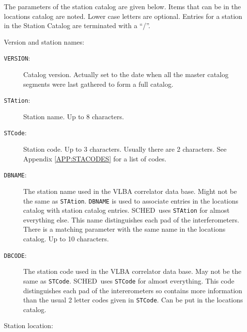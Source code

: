 \documentclass{report}
\newcommand{\schedb}{{\sc SCHED~}}
\begin{document}
The parameters of the station catalog are given below.  Items that can
be in the locations catalog are noted.  Lower case letters are
optional.  Entries for a station in the Station Catalog are terminated with
a ``/''.

Version and station names:

\begin{description}

\item [{\tt VERSION}:] Catalog version.  Actually set to the date when
all the master catalog segments were last gathered to form a full catalog.

\item [{\tt STAtion}:] Station name. Up to 8 characters.

\item [{\tt STCode}:] Station code. Up to 3 characters.  Usually there
are 2 characters.  See Appendix \ref{APP:STACODES} for a list
of codes.

\item [{\tt DBNAME}:] The station name used in the VLBA correlator
data base.  Might not be the same as {\tt STAtion}.  {\tt DBNAME} is
used to associate entries in the locations catalog with station
catalog entries.  \schedb uses {\tt STAtion} for almost everything
else.  This name distinguishes each pad of the interferometers.
There is a matching parameter with the same name in the locations
catalog.  Up to 10 characters.

\item [{\tt DBCODE}:] The station code used in the VLBA correlator
data base.  May not be the same as {\tt STCode}.  \schedb uses
{\tt STCode} for almost everything.  This code distinguishes each
pad of the intererometers so contains more information than the
usual 2 letter codes given in {\tt STCode}.  Can be put in the
locations catalog.

\end{description}

Station location:
\end{document}
